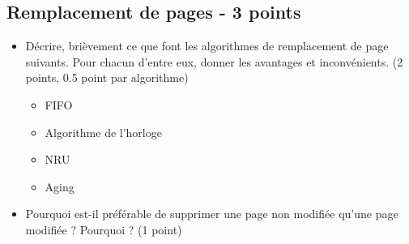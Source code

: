 \subsection{Remplacement de pages - 3 points}
\begin{itemize}
   \item D\'ecrire, bri\`evement ce que font les algorithmes de remplacement de page suivants. Pour chacun d'entre eux, donner les avantages et inconv\'enients. (2 points, 0.5 point par algorithme)
         \begin{itemize}
            \item FIFO
            \item Algorithme de l'horloge
            \item NRU
            \item Aging
         \end{itemize}
   \item Pourquoi est-il pr\'ef\'erable de supprimer une page non modifi\'ee qu'une page modifi\'ee ? Pourquoi ? (1 point)
\end{itemize}

